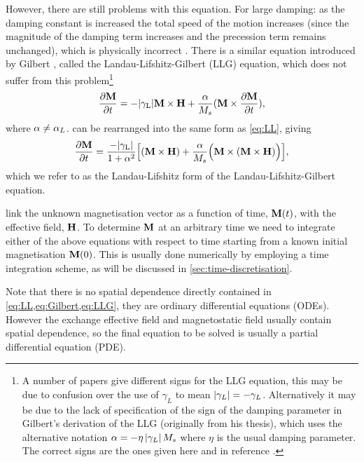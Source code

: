 However, there are still problems with this equation.
For large damping: as the damping constant is increased the total speed of the motion increases (since the magnitude of the damping term increases and the precession term remains unchanged), which is physically incorrect \cite{Mallinson1987}.
There is a similar equation introduced by Gilbert \cite{Gilbert2004}, called the Landau-Lifshitz-Gilbert (LLG) equation, which does not suffer from this problem\footnote{A number of papers give different signs for the LLG equation, this may be due to confusion over the use of $\gamma_L$ to mean $\left|{\gamma_L} \right| = -\gamma_L$. Alternatively it may be due to the lack of specification of the sign of the damping parameter in Gilbert's derivation of the LLG \cite{Gilbert2004} (originally from his thesis), which uses the alternative notation $\alpha = -\eta \left|{\gamma_L} \right| M_s$ where $\eta$ is the usual damping parameter. The correct signs are the ones given here and in reference \cite{Mallinson2000}.}
\begin{equation}
  \label{eq:Gilbert}
  \frac{\partial \boldsymbol{\mathrm{M}}}{\partial t} = - {\left|{\gamma_{\mathrm{\tiny{L}}}} \right|} \boldsymbol{\mathrm{M}} \times \boldsymbol{\mathrm{H}} + \frac{\alpha}{M_s} (\boldsymbol{\mathrm{M}} \times \frac{\partial \boldsymbol{\mathrm{M}}}{\partial t}),
\end{equation}
where $\alpha \neq \alpha_L$.  can be rearranged into the same form \cite[181]{Aharoni1996} as \cref{eq:LL}, giving
\begin{equation}
  \label{eq:LLG}
  \frac{\partial \boldsymbol{\mathrm{M}}}{\partial t} = \frac{-{\left|{\gamma_{\mathrm{\tiny{L}}}} \right|}}{1 + \alpha^2} \Big[ (\boldsymbol{\mathrm{M}} \times \boldsymbol{\mathrm{H}}) + \frac{\alpha}{M_s} \Big(\boldsymbol{\mathrm{M}} \times (\boldsymbol{\mathrm{M}} \times \boldsymbol{\mathrm{H}}) \Big) \Big],
\end{equation}
which we refer to as the Landau-Lifshitz form of the Landau-Lifshitz-Gilbert equation.

 link the unknown magnetisation vector as a function of time, $\boldsymbol{\mathrm{M}}(t)$, with the effective field, $\boldsymbol{\mathrm{H}}$.
To determine $\boldsymbol{\mathrm{M}}$ at an arbitrary time we need to integrate either of the above equations with respect to time starting from a known initial magnetisation $\boldsymbol{\mathrm{M}}(0)$.
This is usually done numerically by employing a time integration scheme, as will be discussed in \cref{sec:time-discretisation}.

Note that there is no spatial dependence directly contained in \cref{eq:LL,eq:Gilbert,eq:LLG}, \ie they are ordinary differential equations (ODEs).
However the exchange effective field and magnetostatic field usually contain spatial dependence, so the final equation to be solved is usually a partial differential equation (PDE).



